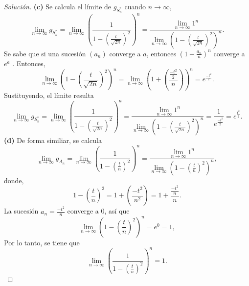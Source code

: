 \documentclass[12pt,letterpaper]{article}
\begin{document}
\begin{proof}[Solución]
\textbf{(c)} Se calcula el límite de $g_{S^*_n}$ cuando $n\longrightarrow \infty$,
\begin{equation}
	\lim\limits_{n \longrightarrow \infty} g_{S^*_n} = \lim_{n \longrightarrow \infty} \left( \frac{1}{1-\left(\frac{t}{\sqrt{2n}}\right)^2} \right)^n = \frac{\lim\limits_{ n \longrightarrow \infty} 1^n}{\lim\limits_{n \longrightarrow \infty} \left(1-\left(\frac{t}{\sqrt{2n}}\right)^2\right)^n}.
\end{equation}
Se sabe que si una sucesión $(a_n)$ converge a $a$, entonces $(1 + \frac{a_n}{n})^n$ converge a $e^a$ \cite{Casella}. Entonces,
\begin{equation}
	\lim\limits_{n \longrightarrow \infty} \left(1-\left(\frac{t}{\sqrt{2n}}\right)^2\right)^n = \lim\limits_{n \longrightarrow \infty} \left(1+\left(\frac{\frac{-t^2}{2}}{n}\right)\right)^n =e^{\frac{-t^2}{2}}.
\end{equation}
Sustituyendo, el límite resulta
\begin{equation}
	\lim\limits_{n\longrightarrow \infty} g_{S^*_n} = \lim\limits_{n \longrightarrow \infty} \left( \frac{1}{1-\left(\frac{t}{\sqrt{2n}}\right)^2} \right)^n = \frac{\lim\limits_{n \longrightarrow \infty} 1^n}{\lim\limits_{n \longrightarrow \infty} \left(1-\left(\frac{t}{\sqrt{2n}}\right)^2\right)^n} = \frac{1}{e^{\frac{-t^2}{2}}} = e^{\frac{t^2}{2}}.
\end{equation}
\textbf{(d)} De forma similiar, se calcula
	\begin{equation}
		\lim\limits_{n \longrightarrow \infty} g_{A_n} =\lim_{n \longrightarrow \infty}  \left( \frac{1}{1-\left(\frac{t}{n}\right)^2} \right)^n = \frac{\lim\limits_{n \longrightarrow \infty} 1^n}{\lim\limits_{n \longrightarrow \infty} \left( 1-\left(\frac{t}{n}\right)^2 \right)^n},
	\end{equation}
	donde, 
\begin{equation}
	1-\left(\frac{t}{n}\right)^2 = 1 + \left( \frac{-t^2}{n^2}\right) = 1 + \frac{\frac{-t^2}{n}}{n}.
\end{equation}
La sucesión $a_n = \frac{-t^2}{n}$ converge a 0, así que 
\begin{equation}
	\lim\limits_{n \longrightarrow \infty} \left( 1-\left(\frac{t}{n}\right)^2 \right)^n = e^0 = 1,
\end{equation}
Por lo tanto, se tiene que
\begin{equation}
	\lim\limits_{n \longrightarrow \infty}  \left( \frac{1}{1-\left(\frac{t}{n}\right)^2} \right)^n = 1.
\end{equation}
\end{proof}



 

\end{document}
